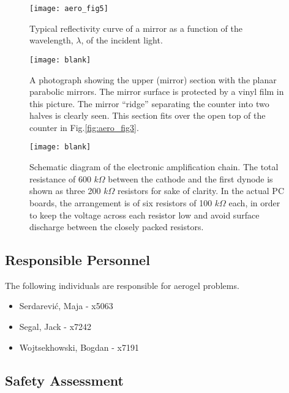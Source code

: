 \begin{figure}[htp]
\texttt{[image: aero\_fig5]}
\caption{
 Typical reflectivity curve of a mirror as a function of the 
 wavelength, $\lambda$, of the incident light.
 }
\label{fig:aero_fig5}
\end{figure}

\begin{figure}[p]
\texttt{[image: blank]}
\caption{
 A photograph showing the upper (mirror) section with the planar
 parabolic mirrors.  The mirror surface is protected by a vinyl film in this
 picture.  The mirror ``ridge'' separating the counter into two halves is
 clearly seen.  This section fits over the open top of the counter in Fig.\ref{fig:aero_fig3}.
 }
\label{fig:aero_fig6}
\end{figure}

\begin{figure}[p]
\texttt{[image: blank]}
\caption{
 Schematic diagram of the electronic amplification chain. The total 
 resistance of 600 $k\Omega$ between the cathode and the first dynode is shown 
 as three 200 $k\Omega$ resistors for sake of clarity. In the actual PC boards, 
 the arrangement is of six resistors of 100 $k\Omega$ each, in order to 
 keep the voltage across each resistor low and avoid surface discharge 
 between the closely packed resistors.
 }
\label{fig:aero_fig7}
\end{figure}

\subsection{Responsible Personnel} 
The following individuals are responsible for aerogel \Cerenkov problems. 
\begin{itemize}
\item[~]Serdarevi\'c, Maja - x5063
\item[~]Segal, Jack - x7242 
\item[~]Wojtsekhowski, Bogdan - x7191 
\end{itemize} 
 


\subsection{Safety Assessment}

